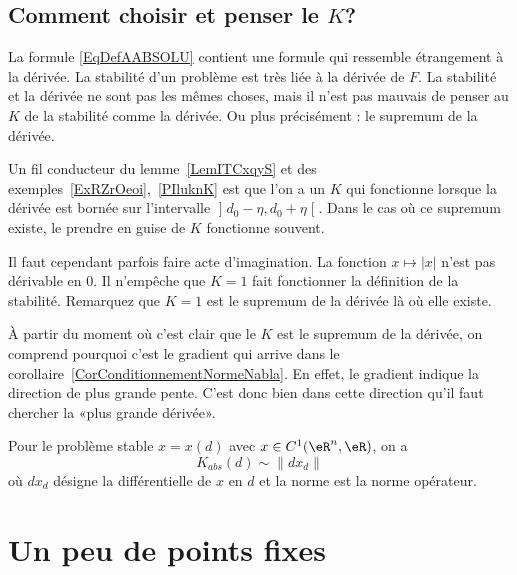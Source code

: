 \subsection{Comment choisir et penser le $K$?}

La formule \eqref{EqDefAABSOLU} contient une formule qui ressemble étrangement à la dérivée. La stabilité d'un problème est très liée à la dérivée de $F$. La stabilité et la dérivée ne sont pas les mêmes choses, mais il n'est pas mauvais de penser au $K$ de la stabilité comme la dérivée. Ou plus précisément : le supremum de la dérivée.

Un fil conducteur du lemme~\ref{LemITCxqyS} et des exemples~\ref{ExRZrOeoi},~\ref{PIluknK} est que l'on a un $K$ qui fonctionne lorsque la dérivée est bornée sur l'intervalle $\mathopen] d_0-\eta , d_0+\eta \mathclose[$. Dans le cas où ce supremum existe, le prendre en guise de $K$ fonctionne souvent.

Il faut cependant parfois faire acte d'imagination. La fonction $x\mapsto| x |$ n'est pas dérivable en $0$. Il n'empêche que $K=1$ fait fonctionner la définition de la stabilité. Remarquez que $K=1$ est le supremum de la dérivée là où elle existe.

À partir du moment où c'est clair que le $K$ est le supremum de la dérivée, on comprend pourquoi c'est le gradient qui arrive dans le corollaire~\ref{CorConditionnementNormeNabla}. En effet, le gradient indique la direction de plus grande pente. C'est donc bien dans cette direction qu'il faut chercher la «plus grande dérivée».

\begin{proposition}
	Pour le problème stable $x=x(d)$ avec $x\in C^1(\eR^n,\eR)$, on a
	\begin{equation}
		K_{abs}(d)\sim\| dx_d \|
	\end{equation}
	où \( dx_d\) désigne la différentielle de $x$ en $d$ et la norme est la norme opérateur.
\end{proposition}

\section{Un peu de points fixes}
\label{SECooWUVTooMhmvaW}

